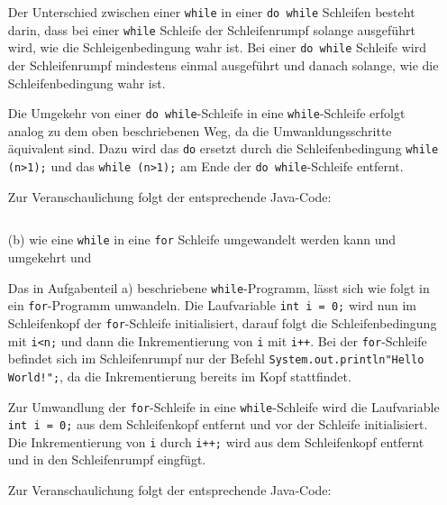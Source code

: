 \begin{itemize}
  Der Unterschied zwischen einer \texttt{while} in einer \texttt{do while} Schleifen
  besteht darin, dass bei einer \texttt{while} Schleife der Schleifenrumpf
  solange ausgeführt wird, wie die Schleigenbedingung wahr ist. Bei einer \texttt{do while} Schleife
  wird der Schleifenrumpf mindestens einmal ausgeführt und danach solange, wie 
  die Schleifenbedingung wahr ist.

  Die Umgekehr von einer \texttt{do while}-Schleife in eine \texttt{while}-Schleife
  erfolgt analog zu dem oben beschriebenen Weg, da die Umwanldungsschritte äquivalent sind. 
  Dazu wird das \texttt{do} ersetzt durch die Schleifenbedingung \texttt{while (n>1);}
  und das \texttt{while (n>1);} am Ende der \texttt{do while}-Schleife entfernt.

  \newpage

  Zur Veranschaulichung folgt der entsprechende Java-Code:
  \begin{itemize}
    \item [] \inputminted[]{Java}{A8_4_while_do_while.java}
  \end{itemize}

  \item [(b)] wie eine \texttt{while} in eine \texttt{for} Schleife umgewandelt werden kann und umgekehrt und

  Das in Aufgabenteil a) beschriebene \texttt{while}-Programm, lässt sich wie folgt in 
  ein \texttt{for}-Programm umwandeln. Die Laufvariable \texttt{int i = 0;} wird nun im Schleifenkopf
  der \texttt{for}-Schleife initialisiert, darauf folgt die Schleifenbedingung mit \texttt{i<n;} und dann die 
  Inkrementierung von \texttt{i} mit \texttt{i++}. Bei der \texttt{for}-Schleife
  befindet sich im Schleifenrumpf nur der Befehl \texttt{System.out.println"Hello World!";},
  da die Inkrementierung bereits im Kopf stattfindet.

  Zur Umwandlung der \texttt{for}-Schleife in eine \texttt{while}-Schleife wird die
  Laufvariable \texttt{int i = 0;} aus dem Schleifenkopf entfernt und vor der
  Schleife initialisiert. Die Inkrementierung von \texttt{i} durch \texttt{i++;}
  wird aus dem Schleifenkopf entfernt und in den Schleifenrumpf eingfügt.

  Zur Veranschaulichung folgt der entsprechende Java-Code:
  \begin{itemize}
    \item [] \inputminted[]{Java}{A8_4_for.java}
  \end{itemize}


\end{itemize}
